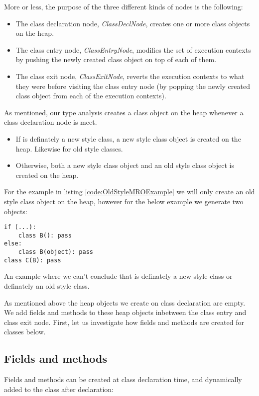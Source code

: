 More or less, the purpose of the three different kinds of nodes is the following:

\begin{itemize}
	\item The class declaration node, \textit{ClassDeclNode}, creates one or more class objects on the heap.
	\item The class entry node, \textit{ClassEntryNode}, modifies the set of execution contexts by pushing the newly created class object on top of each of them.
	\item The class exit node, \textit{ClassExitNode}, reverts the execution contexts to what they were before visiting the class entry node (by popping the newly created class object from each of the execution contexts).
\end{itemize}

As mentioned, our type analysis creates a class object on the heap whenever a class declaration node is meet.

\begin{itemize}
	\item If  is definately a new style class, a new style class object is created on the heap. Likewise for old style classes.
	\item Otherwise, both a new style class object and an old style class object is created on the heap.
\end{itemize}

For the example in listing \ref{code:OldStyleMROExample} we will only create an old style class object on the heap, however for the below example we generate two objects:

\begin{listing}[H]
	\begin{verbatim}
if (...):
	class B(): pass
else:
	class B(object): pass
class C(B): pass
	\end{verbatim}
	\caption{An example where we can't conclude that  is definately a new style class or definately an old style class.}\label{code:NotDefinatelyNewOldStyleClass}
\end{listing}

As mentioned above the heap objects we create on class declaration are empty. We add fields and methods to these heap objects inbetween the class entry and class exit node. First, let us investigate how fields and methods are created for classes below.


\subsection{Fields and methods}
Fields and methods can be created at class declaration time, and dynamically added to the class after declaration:

